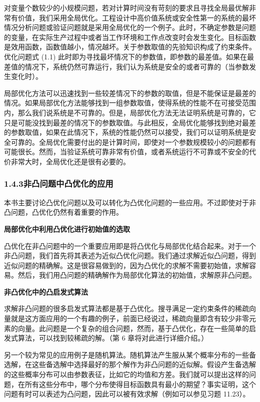 \documentclass[UTF8,12pt,a4paper,fontset=fandol]{ctexart}
\begin{document}
对变量个数较少的小规模问题，若对计算时间没有苛刻的要求且寻找全局最优解非常有价值，我们采用全局优化。工程设计中高价值系统或安全性第一的系统的最坏情况分析问题或验证问题就是采用全局优化的一个例子。此时，不确定参数是问题的变量，在实际生产过程中或者当工作环境和工作点改变时会发生变化。目标函数是效用函数，函数值越小，情况越坏。关于参数取值的先验知识构成了约束条件。优化问题式 (1.1) 此时即为寻找最坏情况下的参数值，即参数的最差值。如果在最差值的情况下，系统仍然可靠运行，我们认为系统是安全的或者可靠的（当参数发生变化时）。

局部优化方法可以迅速找到一些较差情况下的参数的取值，但是不能保证是最差的情况。如果局部优化方法能够找到一组参数取值，使得系统的性能不在可接受范围内，那么我们说系统是不可靠的。但是，局部优化方法无法证明系统是可靠的，它只是可能没找到最差的情况下的参数取值。与此相反，全局优化能够找到绝对最差的参数取值，如果在此情况下，系统的性能仍然可以接受，我们可以证明系统是安全可靠的。全局优化需要付出的是计算时间，即使对一个参数规模较小的问题都有可能很长。然而，当验证系统可靠非常有价值，或者系统运行不可靠或不安全的代价非常大时，全局优化还是很有必要的。

\subsubsection*{1.4.3\quad 非凸问题中凸优化的应用}

本书主要讨论凸优化问题以及可以转化为凸优化问题的一些应用。不过即使对于非凸问题，凸优化仍然有着重要的作用。

\noindent\textbf{局部优化中利用凸优化进行初始值的选取}

凸优化在非凸问题中的一个重要应用即是将凸优化与局部优化结合起来。对于一个非凸问题，我们首先将其表述为近似凸优化问题。我们通过求解近似凸问题，得到近似问题的精确解。这是很容易做到的，因为凸优化的求解不需要初始值，求解容易。然后，我们用凸问题的精确解作为局部优化算法的初始值，求解原非凸问题。

\noindent\textbf{非凸优化中的凸启发式算法}

求解非凸问题的很多启发式算法都是基于凸优化。搜寻满足一定约束条件的稀疏向量就是这方面应用的一个有趣的例子，前面已经说过，稀疏向量即含有较少非零元素的向量。此问题是一个复杂的组合问题，然而，基于凸优化，存在一些简单的启发式算法，可以找到较稀疏的解。（第 6 章将对此进行详细介绍。）

另一个较为常见的应用例子是随机算法。随机算法产生服从某个概率分布的一些备选解，在这些备选解中选择最好的那个解作为非凸问题的近似解。假设产生备选解的这些概率分布可以由参数表征，比如它的均值和方差。我们就可以提出这样的问题，在所有这些分布中，哪个分布使得目标函数具有最小的期望？事实证明，这个问题有时可以表述为凸问题，因此可以被有效求解（例如可以参见习题 11.23）。
\end{document}
